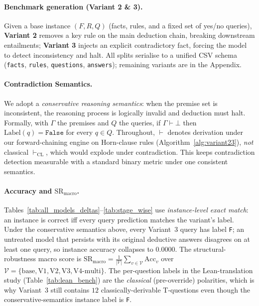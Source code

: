 \documentclass{article}
\begin{document}
\paragraph{Benchmark generation (Variant 2 \& 3).}
Given a base instance $(F,R,Q)$ (facts, rules, and a fixed set of yes/no queries), \textbf{Variant 2} removes a key rule on the main deduction chain, breaking downstream entailments; \textbf{Variant 3} injects an explicit contradictory fact, forcing the model to detect inconsistency and halt. All splits serialise to a unified CSV schema (\texttt{facts}, \texttt{rules}, \texttt{questions}, \texttt{answers}); remaining variants are in the Appendix.

\paragraph{Contradiction Semantics.}
We adopt a \textit{conservative reasoning semantics}: when the premise set is inconsistent, the reasoning process is logically invalid and deduction must halt. Formally, with $\Gamma$ the premises and $Q$ the queries, if $\Gamma \vdash \bot$ then $\text{Label}(q) = \texttt{False}$ for every $q \in Q$. Throughout, $\vdash$ denotes derivation under our forward-chaining engine on Horn-clause rules (Algorithm~\ref{alg:variant23}), \emph{not} classical $\vdash_{\text{CL}}$, which would explode under contradiction. This keeps contradiction detection measurable with a standard binary metric under one consistent semantics.

\paragraph{Accuracy and $\mathrm{SR}_{\text{macro}}$.}
Tables~\ref{tab:all_models_deltas}--\ref{tab:stage_wise} use \emph{instance-level exact match}: an instance is correct iff every query prediction matches the variant's label. Under the conservative semantics above, every Variant~3 query has label \texttt{F}; an untreated model that persists with its original deductive answers disagrees on at least one query, so instance accuracy collapses to $0.0000$. The structural-robustness macro score is $\mathrm{SR}_{\text{macro}} = \tfrac{1}{|\mathcal{V}|} \sum_{v \in \mathcal{V}} \mathrm{Acc}_v$ over $\mathcal{V} = \{\text{base}, \text{V1}, \text{V2}, \text{V3}, \text{V4-multi}\}$. The per-question labels in the Lean-translation study (Table~\ref{tab:lean_bench}) are the \emph{classical} (pre-override) polarities, which is why Variant~3 still contains $12$ classically-derivable T-questions even though the conservative-semantics instance label is \texttt{F}.
\end{document}
